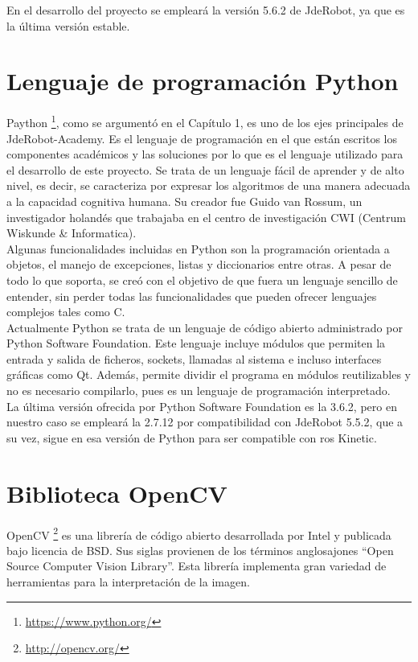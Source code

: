En el desarrollo del proyecto se empleará la versión 5.6.2 de JdeRobot, ya que es la última versión estable.

\section{Lenguaje de programación Python}

Paython \footnote{\url{https://www.python.org/}}, como se argumentó en el Capítulo 1, es uno de los ejes principales de JdeRobot-Academy. Es el lenguaje de programación en el que están escritos los componentes académicos y las soluciones por lo que es el lenguaje utilizado para el desarrollo de este proyecto. Se trata de un lenguaje fácil de aprender y de alto nivel, es decir, se caracteriza por expresar los algoritmos de una manera adecuada a la capacidad cognitiva humana. Su creador fue Guido van Rossum, un investigador holandés que trabajaba en el centro de investigación CWI (Centrum Wiskunde \& Informatica).\\

Algunas funcionalidades incluidas en Python son la programación orientada a objetos, el manejo de excepciones, listas y diccionarios entre otras. A pesar de todo lo que soporta, se creó con el objetivo de que fuera un lenguaje sencillo de entender, sin perder todas las funcionalidades que pueden ofrecer lenguajes complejos tales como C.\\

Actualmente Python se trata de un lenguaje de código abierto administrado por Python Software Foundation. Este lenguaje incluye módulos que permiten la entrada y salida de ficheros, sockets, llamadas al sistema e incluso interfaces gráficas como Qt. Además, permite dividir el programa en módulos reutilizables y no es necesario compilarlo, pues es un lenguaje de programación interpretado. \\

La última versión ofrecida por Python Software Foundation es la 3.6.2, pero en nuestro caso se empleará la 2.7.12 por compatibilidad con JdeRobot 5.5.2, que a su vez, sigue en esa versión de Python para ser compatible con \acrshort{ros} Kinetic.


\section{Biblioteca OpenCV}
OpenCV \footnote{\url{http://opencv.org/}} es una librería de código abierto desarrollada por Intel y publicada bajo licencia de BSD. Sus siglas provienen de los términos anglosajones ``Open Source Computer Vision Library''. Esta librería implementa gran variedad de herramientas para la interpretación de la imagen.\\

